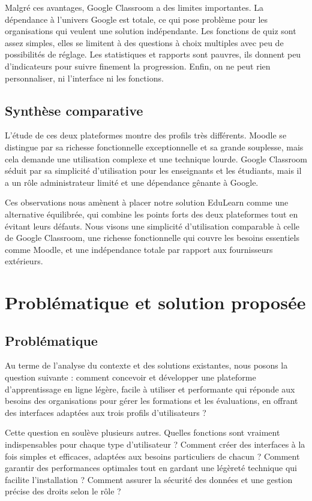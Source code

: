 \documentclass[12pt,a4paper]{report}
\begin{document}
Malgré ces avantages, Google Classroom a des limites importantes. La dépendance à l'univers Google est totale, ce qui pose problème pour les organisations qui veulent une solution indépendante. Les fonctions de quiz sont assez simples, elles se limitent à des questions à choix multiples avec peu de possibilités de réglage. Les statistiques et rapports sont pauvres, ils donnent peu d'indicateurs pour suivre finement la progression. Enfin, on ne peut rien personnaliser, ni l'interface ni les fonctions.

\subsection{Synthèse comparative}
L'étude de ces deux plateformes montre des profils très différents. Moodle se distingue par sa richesse fonctionnelle exceptionnelle et sa grande souplesse, mais cela demande une utilisation complexe et une technique lourde. Google Classroom séduit par sa simplicité d'utilisation pour les enseignants et les étudiants, mais il a un rôle administrateur limité et une dépendance gênante à Google.

Ces observations nous amènent à placer notre solution EduLearn comme une alternative équilibrée, qui combine les points forts des deux plateformes tout en évitant leurs défauts. Nous visons une simplicité d'utilisation comparable à celle de Google Classroom, une richesse fonctionnelle qui couvre les besoins essentiels comme Moodle, et une indépendance totale par rapport aux fournisseurs extérieurs.

\section{Problématique et solution proposée}
\subsection{Problématique}
Au terme de l'analyse du contexte et des solutions existantes, nous posons la question suivante : comment concevoir et développer une plateforme d'apprentissage en ligne légère, facile à utiliser et performante qui réponde aux besoins des organisations pour gérer les formations et les évaluations, en offrant des interfaces adaptées aux trois profils d'utilisateurs ?

Cette question en soulève plusieurs autres. Quelles fonctions sont vraiment indispensables pour chaque type d'utilisateur ? Comment créer des interfaces à la fois simples et efficaces, adaptées aux besoins particuliers de chacun ? Comment garantir des performances optimales tout en gardant une légèreté technique qui facilite l'installation ? Comment assurer la sécurité des données et une gestion précise des droits selon le rôle ?
\end{document}
